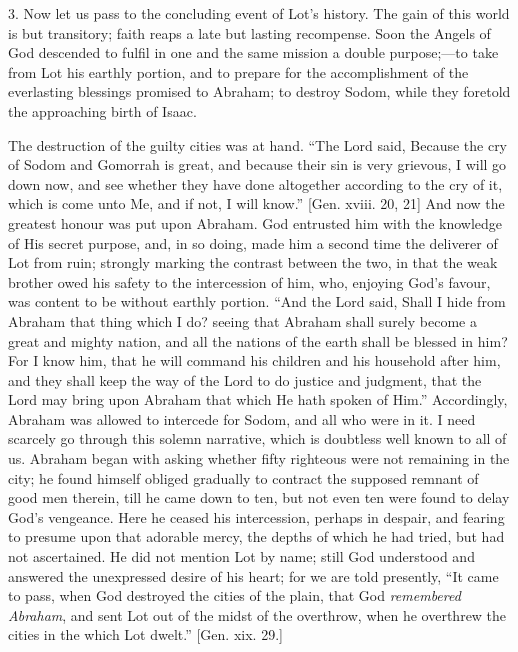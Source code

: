3. Now let us pass to the concluding event of Lot's history. The
gain of this world is but transitory; faith reaps a late but lasting
recompense. Soon the Angels of God descended to fulfil in one and the
same mission a double purpose;—to take from Lot his earthly portion,
and to prepare for the accomplishment of the everlasting blessings
promised to Abraham; to destroy Sodom, while they foretold the
approaching birth of Isaac.

The destruction of the guilty cities was at hand. ``The Lord
said, Because the cry of Sodom and Gomorrah is great, and because
their sin is very grievous, I will go down now, and see whether they
have done altogether according to the cry of it, which is come unto
Me, and if not, I will know.'' [Gen. xviii. 20, 21] And now the
greatest honour was put upon Abraham. God entrusted him with the
knowledge of His secret purpose, and, in so doing, made him a second
time the deliverer of Lot from ruin; strongly marking the contrast
between the two, in that the weak brother owed his safety to the
intercession of him, who, enjoying God's favour, was content to be
without earthly portion. ``And the Lord said, Shall I hide from
Abraham that thing which I do? seeing that Abraham shall surely become
a great and mighty nation, and all the nations of the earth shall be
blessed in him? For I know him, that he will command his children and
his household after him, and they shall keep the way of the Lord to do
justice and judgment, that the Lord may bring upon Abraham that which
He hath spoken of Him.'' Accordingly, Abraham was allowed to
intercede for Sodom, and all who were in it. I need scarcely go
through this solemn narrative, which is doubtless well known to all of
us. Abraham began with asking whether fifty righteous were not
remaining in the city; he found himself obliged gradually to contract
the supposed remnant of good men therein, till he came down to ten,
but not even ten were found to delay God's vengeance. Here he ceased
his intercession, perhaps in despair, and fearing to presume upon that
adorable mercy, the depths of which he had tried, but had not
ascertained. He did not mention Lot by name; still God understood and
answered the unexpressed desire of his heart; for we are told
presently, ``It came to pass, when God destroyed the cities of the
plain, that God \emph{remembered Abraham}, and sent Lot out of the
midst of the overthrow, when he overthrew the cities in the which Lot
dwelt.'' [Gen. xix. 29.]

